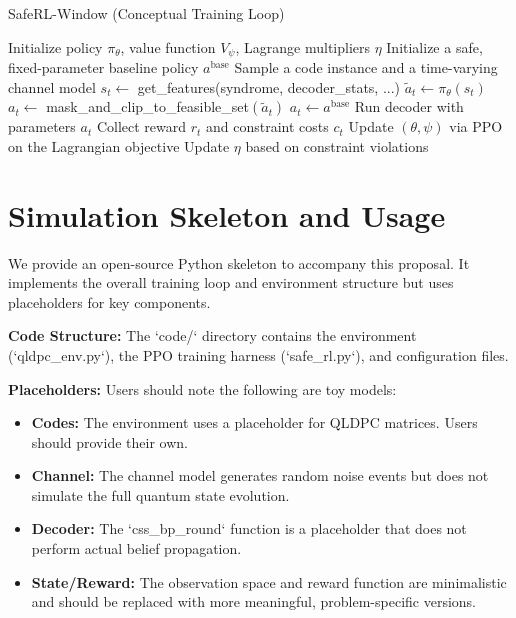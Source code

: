 \documentclass[conference]{IEEEtran}
\begin{document}
\begin{algorithm}[t]
\caption{SafeRL-Window (Conceptual Training Loop)}
\begin{algorithmic}[1]
\State Initialize policy $\pi_\theta$, value function $V_\psi$, Lagrange multipliers $\eta$
\State Initialize a safe, fixed-parameter baseline policy $a^{\text{base}}$
  \State Sample a code instance and a time-varying channel model
    \State $s_t \gets$ get\_features(syndrome, decoder\_stats, ...)
    \State $\tilde a_t \gets \pi_\theta(s_t)$
    \State $a_t \gets$ mask\_and\_clip\_to\_feasible\_set$(\tilde a_t)$
      \State $a_t \gets a^{\text{base}}$ 
    \EndIf
    \State Run decoder with parameters $a_t$
    \State Collect reward $r_t$ and constraint costs $c_t$
  \EndFor
  \State Update $(\theta,\psi)$ via PPO on the Lagrangian objective
  \State Update $\eta$ based on constraint violations
\EndFor
\end{algorithmic}
\end{algorithm}

\section{Simulation Skeleton and Usage}
We provide an open-source Python skeleton to accompany this proposal. It implements the overall training loop and environment structure but uses placeholders for key components.

\textbf{Code Structure:} The `code/` directory contains the environment (`qldpc_env.py`), the PPO training harness (`safe_rl.py`), and configuration files.

\textbf{Placeholders:} Users should note the following are toy models:
\begin{itemize}
    \item \textbf{Codes:} The environment uses a placeholder for QLDPC matrices. Users should provide their own.
    \item \textbf{Channel:} The channel model generates random noise events but does not simulate the full quantum state evolution.
    \item \textbf{Decoder:} The `css_bp_round` function is a placeholder that does not perform actual belief propagation.
    \item \textbf{State/Reward:} The observation space and reward function are minimalistic and should be replaced with more meaningful, problem-specific versions.
\end{itemize}
\end{document}
